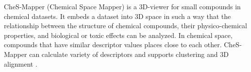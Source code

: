 CheS-Mapper (Chemical Space Mapper) is a 3D-viewer for small compounds in chemical datasets. It embeds a dataset into 3D space in such a way that the relationship between the structure of chemical compounds, their physico-chemical properties, and biological or toxic effects can be analyzed. In chemical space, compounds that have similar descriptor values places close to each other. CheS-Mapper can calculate variety of descriptors and supports clustering and 3D alignment \cite{G_tlein_2012}\cite{G_tlein_2014}. 
